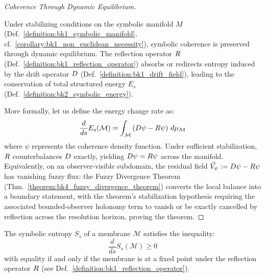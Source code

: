 \begin{proof}[Coherence Through Dynamic Equilibrium]
\label{proof:bk5_coherence_through_dynamic_equilibriium}
\leavevmode

Under stabilizing conditions on the symbolic manifold $M$ (Def.~\ref{definition:bk1_symbolic_manifold}, cf.~\ref{corollary:bk1_non_euclidean_necessity}), symbolic coherence is preserved through dynamic equilibrium. 
The reflection operator $R$ (Def.~\ref{definition:bk1_reflection_operator}) absorbs or redirects entropy induced by the drift operator 
$D$ (Def.~\ref{definition:bk1_drift_field}), leading to the conservation of total structured energy $E_s$ (Def.~\ref{definition:bk2_symbolic_energy}).

More formally, let us define the energy change rate as:
\begin{equation}
\frac{d}{ds} E_s(\mathcal{M}) = \int_{\mathcal{M}} \left( D \psi - R \psi \right) \, d\mu_{\mathcal{M}}
\end{equation}
\noindent where $\psi$ represents the coherence density function. Under sufficient stabilization, 
$R$ counterbalances $D$ exactly, yielding 
$D\psi = R\psi$ across the manifold.
Equivalently, on an observer-visible subdomain, the residual field
$\vec{V}_{\psi}:=D\psi-R\psi$ has vanishing fuzzy flux:
the Fuzzy Divergence Theorem
(Thm.~\ref{theorem:bk4_fuzzy_divergence_theorem}) converts the local balance
into a boundary statement, with the theorem's stabilization hypothesis requiring
the associated bounded-observer holonomy term to vanish or be exactly cancelled
by reflection across the resolution horizon, proving the theorem.
\end{proof}
\begin{theorem} \label{theorem:bk5_symbolic_entropy_production}
The symbolic entropy $S_s$ of a membrane $\mathcal{M}$ satisfies the inequality:
\begin{equation}
\frac{d}{ds} S_s(\mathcal{M}) \geq 0
\end{equation}
\noindent with equality if and only if the membrane is at a fixed point under the reflection operator $R$ (see Def.~\ref{definition:bk1_reflection_operator}).
\end{theorem}

